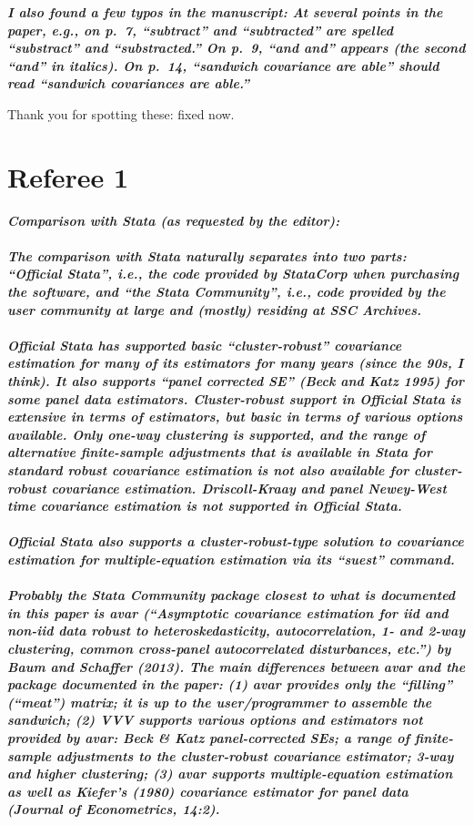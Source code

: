 \documentclass[10pt,a4paper]{article}
\begin{document}
\medskip

\textbf{\textit{I also found a few typos in the manuscript: At several points in the paper,
e.g., on p.~7, ``subtract'' and ``subtracted'' are spelled ``substract'' and
``substracted.'' On p.~9, ``and and'' appears (the second ``and'' in italics). 
On p.~14, ``sandwich covariance are able'' should read ``sandwich covariances
are able.''}}

\medskip

Thank you for spotting these: fixed now.


\bigskip

\section*{Referee 1}

\textbf{\textit{Comparison with Stata (as requested by the editor):
\\ \\
The comparison with Stata naturally separates into two parts: ``Official Stata'', i.e., the code provided by StataCorp when purchasing the software, and ``the Stata Community'', i.e., code provided by the user community at large and (mostly) residing at SSC Archives.
\\ \\
Official Stata has supported basic ``cluster-robust'' covariance estimation for many of its estimators for many years (since the 90s, I think).  It also supports ``panel corrected SE'' (Beck and Katz 1995) for some panel data estimators.  Cluster-robust support in Official Stata is extensive in terms of estimators, but basic in terms of various options available.  Only one-way clustering is supported, and the range of alternative finite-sample adjustments that is available in Stata for standard robust covariance estimation is not also available for cluster-robust covariance estimation.  Driscoll-Kraay and panel Newey-West time covariance estimation is not supported in Official Stata.
\\ \\
Official Stata also supports a cluster-robust-type solution to covariance estimation for multiple-equation estimation via its ``suest'' command.
\\ \\
Probably the Stata Community package closest to what is documented in this paper is avar (``Asymptotic covariance estimation for iid and non-iid data robust to heteroskedasticity, autocorrelation, 1- and 2-way clustering, common cross-panel autocorrelated disturbances, etc.'') by Baum and Schaffer (2013).  The main differences between avar and the package documented in the paper: (1) avar provides only the ``filling'' (``meat'') matrix; it is up to the user/programmer to assemble the sandwich; (2) VVV supports various options and estimators not provided by avar: Beck \& Katz panel-corrected SEs; a range of finite-sample adjustments to the cluster-robust covariance estimator; 3-way and higher clustering; (3) avar supports multiple-equation estimation as well as Kiefer's (1980) covariance estimator for panel data (Journal of Econometrics, 14:2).}}
\end{document}
